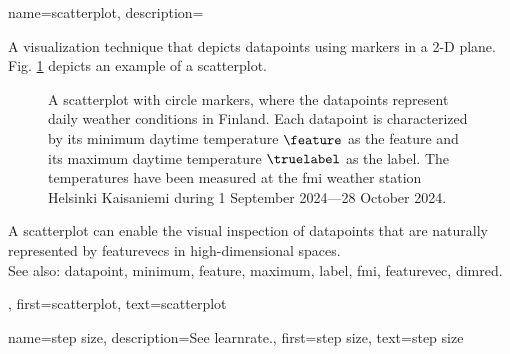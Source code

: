 {name={scatterplot}, 
	description={A 
		visualization technique that depicts \glspl{datapoint} using markers in a 2-D plane. 
		Fig. \ref{fig_scatterplot_temp_FMI_dict} depicts an example of a scatterplot.  
		\begin{figure}[H]
			\begin{center}
				\vspace*{-10mm}
			\end{center}
			\caption{A scatterplot with circle markers, where the \glspl{datapoint} represent daily weather conditions in Finland. 
				Each \gls{datapoint} is characterized by its \gls{minimum} daytime temperature $\feature$ 
				as the \gls{feature} and its \gls{maximum} daytime temperature $\truelabel$ as the \gls{label}. 
				The temperatures have been measured at the \gls{fmi} weather station Helsinki Kaisaniemi 
				during 1 September 2024—28 October 2024.}
			\label{fig_scatterplot_temp_FMI_dict}
			\vspace*{-3mm}
			\end{figure}
		A scatterplot can enable the visual inspection of \glspl{datapoint} that are naturally 
		represented by \glspl{featurevec} in high-dimensional spaces.
		\\
		See also: \gls{datapoint}, \gls{minimum}, \gls{feature}, \gls{maximum}, \gls{label}, \gls{fmi}, \gls{featurevec}, \gls{dimred}.},
	first={scatterplot},
	text={scatterplot} 
}


{name={step size}, 
	description={See \gls{learnrate}.}, 
	first={step size},
	text={step size} 
}

